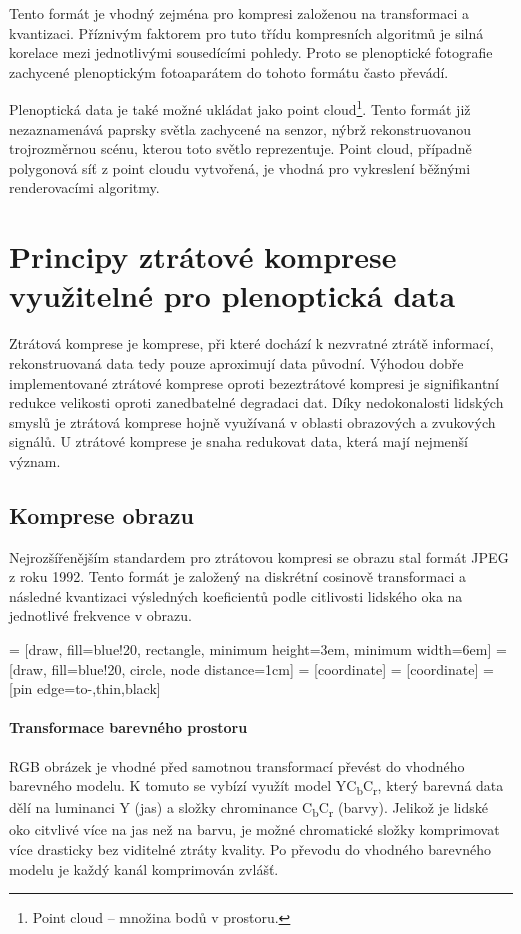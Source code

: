 Tento formát je vhodný zejména pro kompresi založenou na transformaci a kvantizaci.
Příznivým faktorem pro tuto třídu kompresních algoritmů je silná korelace mezi jednotlivými sousedícími pohledy.
Proto se plenoptické fotografie zachycené plenoptickým fotoaparátem do tohoto formátu často převádí.

Plenoptická data je také možné ukládat jako point cloud\footnote{Point cloud -- množina bodů v prostoru.}.
Tento formát již nezaznamenává paprsky světla zachycené na senzor, nýbrž rekonstruovanou trojrozměrnou scénu, kterou toto světlo reprezentuje.
Point cloud, případně polygonová síť z point cloudu vytvořená, je vhodná pro vykreslení běžnými renderovacími algoritmy.

\chapter{Principy ztrátové komprese využitelné pro plenoptická data}
Ztrátová komprese je komprese, při které dochází k nezvratné ztrátě informací, rekonstruovaná data tedy pouze aproximují data původní.
Výhodou dobře implementované ztrátové komprese oproti bezeztrátové kompresi je signifikantní redukce velikosti oproti zanedbatelné degradaci dat.
Díky nedokonalosti lidských smyslů je ztrátová komprese hojně využívaná v oblasti obrazových a zvukových signálů.
U ztrátové komprese je snaha redukovat data, která mají nejmenší význam.

\section{Komprese obrazu}
Nejrozšířenějším standardem pro ztrátovou kompresi se obrazu stal formát JPEG z roku 1992.
Tento formát je založený na diskrétní cosinově transformaci a následné kvantizaci výsledných koeficientů podle citlivosti lidského oka na jednotlivé frekvence v obrazu.

 = [draw, fill=blue!20, rectangle,
    minimum height=3em, minimum width=6em]
 = [draw, fill=blue!20, circle, node distance=1cm]
 = [coordinate]
 = [coordinate]
 = [pin edge={to-,thin,black}]


\subsubsection*{Transformace barevného prostoru}

RGB obrázek je vhodné před samotnou transformací převést do vhodného barevného modelu.
K tomuto se vybízí využít model YC\textsubscript{b}C\textsubscript{r}, který barevná data dělí na luminanci Y (jas) a složky chrominance C\textsubscript{b}C\textsubscript{r} (barvy).
Jelikož je lidské oko citvlivé více na jas než na barvu, je možné chromatické složky komprimovat více drasticky bez viditelné ztráty kvality.
Po převodu do vhodného barevného modelu je každý kanál komprimován zvlášť.

